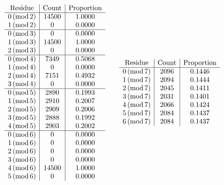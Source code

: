 \documentclass[10pt,reqno]{amsart}
\newcommand{\0}{\color{lightgray}0}
\renewcommand{\pmod}[1]{\,(\operatorname{mod} #1)}
\renewcommand\>{\rangle}
\newcommand\<{\langle}
\theoremstyle{plain}
\theoremstyle{definition}
\begin{document}
\begin{table}
\small
\begin{equation*}
\begin{array}{c|c|c}
\text{Residue} & \text{Count} & \text{Proportion}\\
\hline
0 \pmod{ 2 } &   14500 &   1.0000 \\
1 \pmod{ 2 } &   0     &   0.0000 \\
\hline
0 \pmod{ 3 } &   0     &   0.0000 \\
1 \pmod{ 3 } &   14500 &   1.0000 \\
2 \pmod{ 3 } &   0     &   0.0000 \\
\hline
0 \pmod{ 4 } &   7349  &   0.5068 \\
1 \pmod{ 4 } &   0     &   0.0000 \\
2 \pmod{ 4 } &   7151  &   0.4932 \\
3 \pmod{ 4 } &   0     &   0.0000 \\
\hline
0 \pmod{ 5 } &   2890  &   0.1993 \\
1 \pmod{ 5 } &   2910  &   0.2007 \\
2 \pmod{ 5 } &   2909  &   0.2006 \\
3 \pmod{ 5 } &   2888  &   0.1992 \\
4 \pmod{ 5 } &   2903  &   0.2002 \\
\hline
0 \pmod{ 6 } &   0     &   0.0000 \\
1 \pmod{ 6 } &   0     &   0.0000 \\
2 \pmod{ 6 } &   0     &   0.0000 \\
3 \pmod{ 6 } &   0     &   0.0000 \\
4 \pmod{ 6 } &   14500 &   1.0000 \\
5 \pmod{ 6 } &   0     &   0.0000 \\
\end{array}
\qquad
\begin{array}{c@{}c|c|c}
\text{Residue} && \text{Count} & \text{Proportion}\\
\hline
0 \pmod{ 7 } &&   2096  &   0.1446 \\
1 \pmod{ 7 } &&   2094  &   0.1444 \\
2 \pmod{ 7 } &&   2045  &   0.1411 \\
3 \pmod{ 7 } &&   2031  &   0.1401 \\
4 \pmod{ 7 } &&   2066  &   0.1424 \\
5 \pmod{ 7 } &&   2084  &   0.1437 \\
6 \pmod{ 7 } &&   2084  &   0.1437 \\

\end{array}
\end{equation*}
\end{table}
\end{document}
